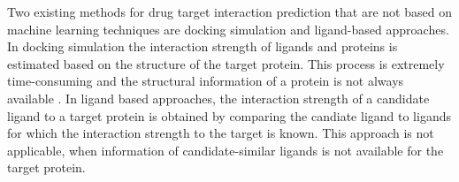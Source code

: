 Two existing methods for drug target interaction prediction that are not based on machine learning techniques are docking simulation and ligand-based approaches. In docking simulation the interaction strength of ligands and proteins is estimated based on the structure of the target protein. This process is extremely time-consuming and the structural information of a protein is not always available \cite{liu2016neighborhood}. In ligand based approaches, the interaction strength of a candidate ligand to a target protein is obtained by comparing the candiate ligand to ligands for which the interaction strength to the target is known. This approach is not applicable, when information of candidate-similar ligands is not available for the target protein.